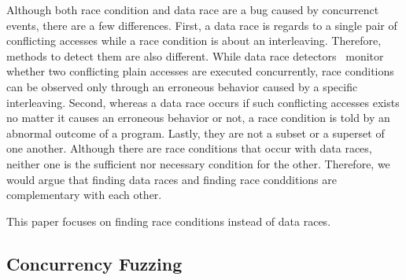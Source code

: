 %
%
%
Although both race condition and data race are a bug caused by
concurrenct events, there are a few differences.
%
First, a data race is regards to a single pair of conflicting accesses
while a race condition is about an interleaving.
%
Therefore, methods to detect them are also different.  While data race
detectors~\cite{tsan, krace, prorace, crsampler, txrace} monitor
whether two conflicting plain accesses are executed concurrently, race
conditions can be observed only through an erroneous behavior caused
by a specific interleaving.
%
Second, whereas a data race occurs if such conflicting accesses exists
no matter it causes an erroneous behavior or not, a race condition is
told by an abnormal outcome of a program.
%
%
%
Lastly, they are not a subset or a superset of one another. Although
there are race conditions that occur with data races, neither one is
the sufficient nor necessary condition for the other. Therefore, we
would argue that finding data races and finding race condditions are
complementary with each other.


%
This paper focuses on finding race conditions instead of data races.




\subsection{Concurrency Fuzzing}
\label{ss:concurrencyfuzzing}


